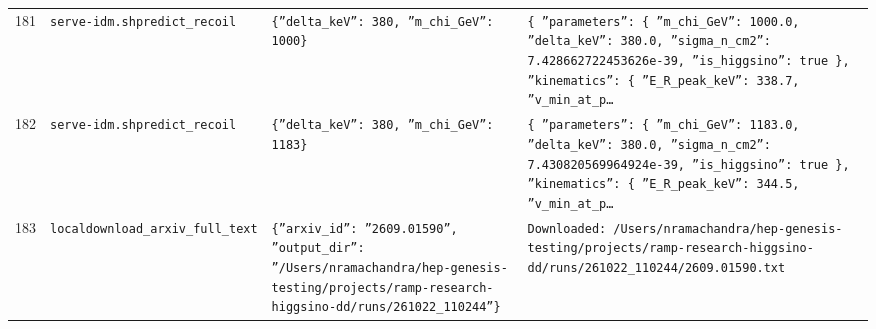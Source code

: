 \documentclass[11pt,a4paper]{article}
\begin{document}
\begin{longtable}{@{}p{}p{}p{}p{}@{}}
181 & \texttt{serve-idm.sh}\newline\texttt{predict\_\allowbreak{}recoil} & \texttt{\{''delta\_\allowbreak{}keV'':\allowbreak{} 380,\allowbreak{} ''m\_\allowbreak{}chi\_\allowbreak{}GeV'':\allowbreak{} 1000\}\allowbreak{}} & \texttt{\{   ''parameters'':\allowbreak{} \{     ''m\_\allowbreak{}chi\_\allowbreak{}GeV'':\allowbreak{} 1000.0,\allowbreak{}     ''delta\_\allowbreak{}keV'':\allowbreak{} 380.0,\allowbreak{}     ''sigma\_\allowbreak{}n\_\allowbreak{}cm2'':\allowbreak{} 7.428662722453626e-39,\allowbreak{}     ''is\_\allowbreak{}higgsino'':\allowbreak{} true   \}\allowbreak{},\allowbreak{}   ''kinematics'':\allowbreak{} \{     ''E\_\allowbreak{}R\_\allowbreak{}peak\_\allowbreak{}keV'':\allowbreak{} 338.7,\allowbreak{}     ''v\_\allowbreak{}min\_\allowbreak{}at\_\allowbreak{}p\ldots{}\allowbreak{}} \\
182 & \texttt{serve-idm.sh}\newline\texttt{predict\_\allowbreak{}recoil} & \texttt{\{''delta\_\allowbreak{}keV'':\allowbreak{} 380,\allowbreak{} ''m\_\allowbreak{}chi\_\allowbreak{}GeV'':\allowbreak{} 1183\}\allowbreak{}} & \texttt{\{   ''parameters'':\allowbreak{} \{     ''m\_\allowbreak{}chi\_\allowbreak{}GeV'':\allowbreak{} 1183.0,\allowbreak{}     ''delta\_\allowbreak{}keV'':\allowbreak{} 380.0,\allowbreak{}     ''sigma\_\allowbreak{}n\_\allowbreak{}cm2'':\allowbreak{} 7.430820569964924e-39,\allowbreak{}     ''is\_\allowbreak{}higgsino'':\allowbreak{} true   \}\allowbreak{},\allowbreak{}   ''kinematics'':\allowbreak{} \{     ''E\_\allowbreak{}R\_\allowbreak{}peak\_\allowbreak{}keV'':\allowbreak{} 344.5,\allowbreak{}     ''v\_\allowbreak{}min\_\allowbreak{}at\_\allowbreak{}p\ldots{}\allowbreak{}} \\
183 & \texttt{local}\newline\texttt{download\_\allowbreak{}arxiv\_\allowbreak{}full\_\allowbreak{}text} & \texttt{\{''arxiv\_\allowbreak{}id'':\allowbreak{} ''2609.01590'',\allowbreak{} ''output\_\allowbreak{}dir'':\allowbreak{} ''/\allowbreak{}Users/\allowbreak{}nramachandra/\allowbreak{}hep-genesis-testing/\allowbreak{}projects/\allowbreak{}ramp-research-higgsino-dd/\allowbreak{}runs/\allowbreak{}261022\_\allowbreak{}110244''\}\allowbreak{}} & \texttt{Downloaded:\allowbreak{} /\allowbreak{}Users/\allowbreak{}nramachandra/\allowbreak{}hep-genesis-testing/\allowbreak{}projects/\allowbreak{}ramp-research-higgsino-dd/\allowbreak{}runs/\allowbreak{}261022\_\allowbreak{}110244/\allowbreak{}2609.01590.txt} \\

\end{longtable}
\end{document}
